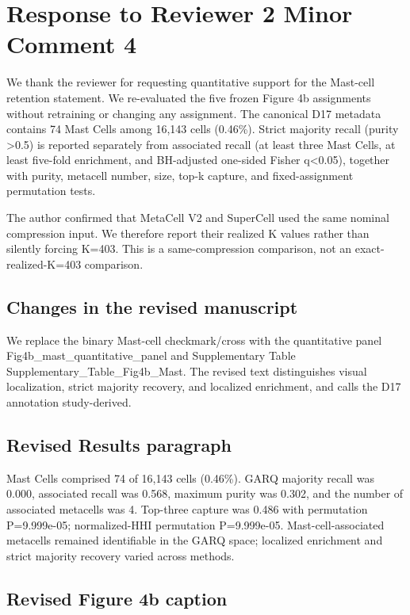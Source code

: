 \section*{Response to Reviewer 2 Minor Comment 4}

We thank the reviewer for requesting quantitative support for the Mast-cell
retention statement. We re-evaluated the five frozen Figure 4b assignments
without retraining or changing any assignment. The canonical D17 metadata
contains 74 Mast Cells among 16,143 cells (0.46\%). Strict majority recall
(purity >0.5) is reported separately from associated recall (at least three
Mast Cells, at least five-fold enrichment, and BH-adjusted one-sided Fisher
q<0.05), together with purity, metacell number, size, top-k capture, and
fixed-assignment permutation tests.

The author confirmed that MetaCell V2 and SuperCell used the same nominal
compression input. We therefore report their realized K values rather than
silently forcing K=403. This is a same-compression comparison, not an
exact-realized-K=403 comparison.

\subsection*{Changes in the revised manuscript}

We replace the binary Mast-cell checkmark/cross with the quantitative panel
Fig4b_mast_quantitative_panel and Supplementary Table
Supplementary_Table_Fig4b_Mast. The revised text distinguishes visual
localization, strict majority recovery, and localized enrichment, and calls
the D17 annotation study-derived.

\subsection*{Revised Results paragraph}

Mast Cells comprised 74 of 16,143 cells (0.46\%). GARQ majority recall was
0.000, associated recall was 0.568,
maximum purity was 0.302, and the number of associated
metacells was 4. Top-three capture was
0.486 with permutation P=9.999e-05; normalized-HHI
permutation P=9.999e-05. Mast-cell-associated metacells remained identifiable in the GARQ space; localized enrichment and strict majority recovery varied across methods.

\subsection*{Revised Figure 4b caption}

